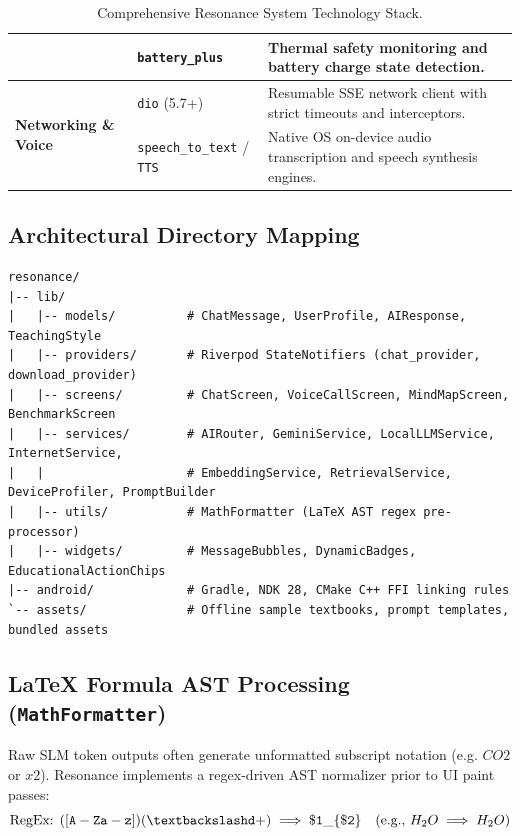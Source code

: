 \documentclass[10.5pt,a4paper]{article}
\begin{document}
\begin{table}[h!]
\begin{tabularx}{\textwidth}{llp{7.8cm}}
  & \texttt{battery\_plus} & Thermal safety monitoring and battery charge state detection. \\
\midrule
\multirow{2}{*}{\textbf{Networking \& Voice}} 
  & \texttt{dio} (5.7+) & Resumable SSE network client with strict timeouts and interceptors. \\
  & \texttt{speech\_to\_text} / \texttt{TTS} & Native OS on-device audio transcription and speech synthesis engines. \\
\bottomrule
\end{tabularx}
\caption{Comprehensive Resonance System Technology Stack.}
\label{tab:techstack}
\end{table}

\vspace{-0.2cm}

\subsection{Architectural Directory Mapping}
\begin{lstlisting}[basicstyle=\ttfamily\tiny]
resonance/
|-- lib/
|   |-- models/          # ChatMessage, UserProfile, AIResponse, TeachingStyle
|   |-- providers/       # Riverpod StateNotifiers (chat_provider, download_provider)
|   |-- screens/         # ChatScreen, VoiceCallScreen, MindMapScreen, BenchmarkScreen
|   |-- services/        # AIRouter, GeminiService, LocalLLMService, InternetService,
|   |                    # EmbeddingService, RetrievalService, DeviceProfiler, PromptBuilder
|   |-- utils/           # MathFormatter (LaTeX AST regex pre-processor)
|   |-- widgets/         # MessageBubbles, DynamicBadges, EducationalActionChips
|-- android/             # Gradle, NDK 28, CMake C++ FFI linking rules
`-- assets/              # Offline sample textbooks, prompt templates, bundled assets
\end{lstlisting}

\subsection{LaTeX Formula AST Processing (\texttt{MathFormatter})}
Raw SLM token outputs often generate unformatted subscript notation (e.g. $CO2$ or $x2$). Resonance implements a regex-driven AST normalizer prior to UI paint passes:
\begin{equation}
  \text{RegEx: } \mathtt{([A-Za-z])(\textbackslash d+)} \implies \mathtt{\$1\_\{\$2\}} \quad (\text{e.g., } H_2O \implies H_2O)
\end{equation}
\end{document}
